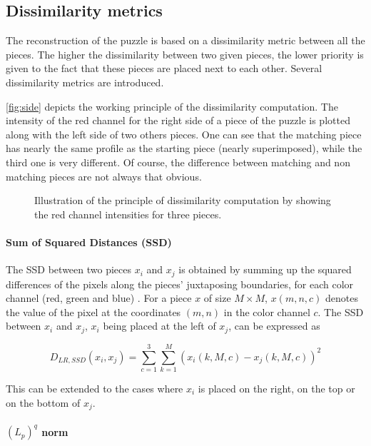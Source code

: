 \subsection{Dissimilarity metrics}

The reconstruction of the puzzle is based on a dissimilarity metric between all the pieces. The higher the dissimilarity between two given pieces, the lower priority is given to the fact that these pieces are placed next to each other. Several dissimilarity metrics are introduced.

\autoref{fig:side} depicts the working principle of the dissimilarity computation. The intensity of the red channel for the right side of a piece of the puzzle is plotted along with the left side of two others pieces. One can see that the matching piece has nearly the same profile as the starting piece (nearly superimposed), while the third one is very different. Of course, the difference between matching and non matching pieces are not always that obvious.

\begin{figure}[H]
    \centering
    
    \caption{Illustration of the principle of dissimilarity computation by showing the red channel intensities for three pieces.}
    \label{fig:side}
\end{figure}

\paragraph{Sum of Squared Distances (SSD)} \mbox{} 

The SSD between two pieces $x_i$ and $x_j$ is obtained by summing up the squared differences of the pixels along the pieces' juxtaposing boundaries, for each color channel (red, green and blue) \cite{robust}. For a piece $x$ of size $M \times M$, $x(m,n,c)$ denotes the value of the pixel at the coordinates $(m,n)$ in the color channel $c$. The SSD between $x_i$ and $x_j$, $x_i$ being placed at the left of $x_j$, can be expressed as 

\begin{equation}
    D_{LR,SSD}(x_i, x_j) = \sum_{c=1}^{3} \sum_{k=1}^{M} \left( x_i(k,M,c) - x_j(k,M,c)\right)^2    
\end{equation}

This can be extended to the cases where $x_i$ is placed on the right, on the top or on the bottom of $x_j$.

\paragraph{$(L_p)^q$ norm} \mbox{}

